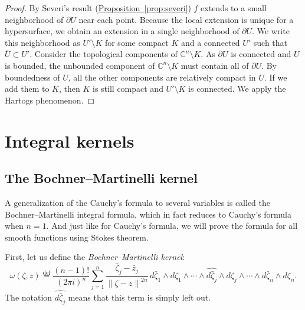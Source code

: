 \documentclass[12pt,openany]{book}
\newcommand{\norm}[1]{\left\lVert {#1} \right\rVert}
\newcommand{\C}{{\mathbb{C}}}
\newcommand{\myindex}[1]{#1\index{#1}}
\theoremstyle{plain}
\theoremstyle{remark}
\theoremstyle{definition}
\theoremstyle{exercise}
\theoremstyle{example}
\newcommand{\propref}[1]{\hyperref[#1]{Proposition~\ref*{#1}}}
\begin{document}
\begin{proof}
By Severi's result (\propref{prop:severi}) $f$ extends to a small neighborhood of $\partial U$
near each point.  Because the local extension is unique for a hypersurface,
we obtain an extension in a single neighborhood of $\partial U$.
We write this neighborhood as $U' \setminus K$ for some compact $K$
and a connected $U'$ such that $\overline{U} \subset U'$.
Consider the topological components of $\C^n \setminus K$.  As
$\partial U$ is connected and $U$ is bounded,
the unbounded component of $\C^n \setminus K$ must contain all of $\partial U$.
By boundedness of $U$, all the other components are
relatively compact in $U$.  If we add them to $K$, then $K$
is still compact and $U' \setminus K$ is connected.
We apply the Hartogs phenomenon.
\end{proof}


\chapter{Integral kernels} \label{ch:integralkernels}


\section{The Bochner--Martinelli kernel}

A generalization of
the Cauchy's formula to several variables
is called the Bochner--Martinelli integral formula,
which in fact reduces 
to Cauchy's formula when $n=1$.
And just like for Cauchy's formula, we will prove the formula for all
smooth functions using Stokes theorem.

First, let us define the \emph{\myindex{Bochner--Martinelli kernel}}:
\begin{equation*}
\omega(\zeta,z)
\overset{\text{def}}{=}
\frac{(n-1)!}{{(2\pi i)}^n}
\sum_{j=1}^n
\frac{\bar{\zeta}_j-\bar{z}_j}{\norm{\zeta-z}^{2n}}
\,
d\bar{\zeta}_1 \wedge d\zeta_1 \wedge
\cdots \wedge
\widehat{ d\bar{\zeta}_j } \wedge d\zeta_j \wedge
\cdots \wedge
d\bar{\zeta}_n \wedge d\zeta_n .
\end{equation*}
The notation $\widehat{ d\bar{\zeta}_j }$ means that this term is
simply left out.
\end{document}
